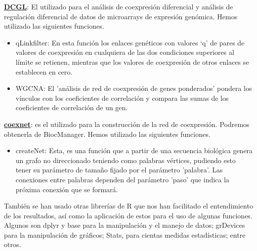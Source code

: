 	\noindent\underline{\bfseries{DCGL}}: El utilizado para el análisis de coexpresión diferencial y análisis de regulación diferencial de datos de microarrays de expresión genómica. Hemos utilizado las siguientes funciones. \\
	
	\begin{itemize}
		
		\item qLinkfilter: En esta función los enlaces genéticos con valores ‘q’ de pares de valores de coexpresión en cualquiera de las dos condiciones superiores al límite se retienen, mientras que los valores de coexpresión de otros enlaces se establecen en cero.
		
		\item WGCNA: El 'análisis de red de coexpresión de genes ponderados' pondera los vínculos con los coeficientes de correlación y compara las sumas de los coeficientes de correlación de un gen.  \\
		
	\end{itemize}

	\noindent\underline{\bfseries{coexnet}}:  es el utilizado para la construcción de la red de coexpresión. Podremos obtenerla de BiocManager. Hemos utilizado las siguientes funciones. \\

		\begin{itemize}
	
			\item createNet: Esta, es una función que a partir de una secuencia biológica genera un grafo no direccionado teniendo como palabras vértices, pudiendo esto tener su parámetro de tamaño fijado por el parámetro 'palabra'. Las conexiones entre palabras dependen del parámetro 'paso' que indica la próxima conexión que se formará. \\
	
	\end{itemize}
	
	\noindent También se han usado otras librerías de R que nos han facilitado el entendimiento de los resultados, así como la aplicación de estos para el uso de algunas funciones. Algunos son dplyr y base para la manipulación y el manejo de datos; grDevices para la manipulación de gráficos; Stats, para cientas medidas estadísticas; entre otros. 
